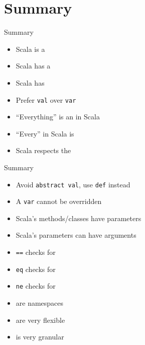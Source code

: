 \section{Summary}
\begin{frame}{Summary}
\begin{itemize}
  \item Scala is a 
  \item Scala has a 
  \item Scala has 
  \item Prefer \lstinline!val! over \lstinline!var!
  \item ``Everything'' is an  in Scala
  \item ``Every''  in Scala is 
  \item Scala respects the 
\end{itemize}
\end{frame}

\begin{frame}[fragile]{Summary}
\begin{itemize}
  \item \alert{Avoid} \lstinline!abstract val!, use \lstinline!def! instead
  \item A \lstinline!var! cannot be overridden
  \item Scala's methods/classes have  parameters
  \item Scala's parameters can have  arguments
  \item \lstinline!==! checks for 
  \item \lstinline!eq! checks for 
  \item \lstinline!ne! checks for 
  \item {} are namespaces
  \item {} are very flexible
  \item {} is very granular
\end{itemize}
\end{frame}